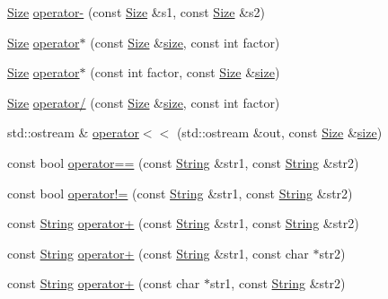 \begin{DoxyCompactItemize}
\item 
\hyperlink{classprism_1_1_size}{Size} \hyperlink{namespaceprism_ab170e3ca42d85a6766cbc7950ddfb0c4}{operator-\/} (const \hyperlink{classprism_1_1_size}{Size} \&s1, const \hyperlink{classprism_1_1_size}{Size} \&s2)
\item 
\hyperlink{classprism_1_1_size}{Size} \hyperlink{namespaceprism_a3d8e53ee3208e09e8736a77be3f485c9}{operator$\ast$} (const \hyperlink{classprism_1_1_size}{Size} \&\hyperlink{namespaceprism_acd3c0f96adf158a29387191d79c4d874}{size}, const int factor)
\item 
\hyperlink{classprism_1_1_size}{Size} \hyperlink{namespaceprism_acd79758984cccce0dddfb459af65f6e1}{operator$\ast$} (const int factor, const \hyperlink{classprism_1_1_size}{Size} \&\hyperlink{namespaceprism_acd3c0f96adf158a29387191d79c4d874}{size})
\item 
\hyperlink{classprism_1_1_size}{Size} \hyperlink{namespaceprism_ad7e100bd6b1730deaab53d1218e29a67}{operator/} (const \hyperlink{classprism_1_1_size}{Size} \&\hyperlink{namespaceprism_acd3c0f96adf158a29387191d79c4d874}{size}, const int factor)
\item 
std\+::ostream \& \hyperlink{namespaceprism_ad6335168e27f481d86ae42da444006d1}{operator$<$$<$} (std\+::ostream \&out, const \hyperlink{classprism_1_1_size}{Size} \&\hyperlink{namespaceprism_acd3c0f96adf158a29387191d79c4d874}{size})
\item 
const bool \hyperlink{namespaceprism_a0e7bfee93ae735b5af7e566ddd8c4f65}{operator==} (const \hyperlink{classprism_1_1_string}{String} \&str1, const \hyperlink{classprism_1_1_string}{String} \&str2)
\item 
const bool \hyperlink{namespaceprism_a5c2215edf9ab445c3c1791217d131b15}{operator!=} (const \hyperlink{classprism_1_1_string}{String} \&str1, const \hyperlink{classprism_1_1_string}{String} \&str2)
\item 
const \hyperlink{classprism_1_1_string}{String} \hyperlink{namespaceprism_a433f7afd310d95a93cf8c03d1f831812}{operator+} (const \hyperlink{classprism_1_1_string}{String} \&str1, const \hyperlink{classprism_1_1_string}{String} \&str2)
\item 
const \hyperlink{classprism_1_1_string}{String} \hyperlink{namespaceprism_a50879e9455a36b7762514951ca0f47f7}{operator+} (const \hyperlink{classprism_1_1_string}{String} \&str1, const char $\ast$str2)
\item 
const \hyperlink{classprism_1_1_string}{String} \hyperlink{namespaceprism_a7d59729f69eafd3bc9f4d30ad9dd06b6}{operator+} (const char $\ast$str1, const \hyperlink{classprism_1_1_string}{String} \&str2)

\end{DoxyCompactItemize}
